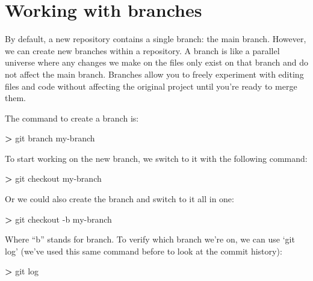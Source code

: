 \documentclass[
]{book}
\newenvironment{Shaded}{\begin{snugshade}}{\end{snugshade}}
\newcommand{\AttributeTok}[1]{\textcolor[rgb]{0.13,0.29,0.53}{#1}}
\newcommand{\ExtensionTok}[1]{#1}
\newcommand{\NormalTok}[1]{#1}
\newcommand{\OperatorTok}[1]{\textcolor[rgb]{0.81,0.36,0.00}{\textbf{#1}}}
\begin{document}
\hypertarget{working-with-branches}{%
\section{Working with branches}\label{working-with-branches}}

By default, a new repository contains a single branch: the main branch. However, we can create new branches within a repository. A branch is like a parallel universe where any changes we make on the files only exist on that branch and do not affect the main branch. Branches allow you to freely experiment with editing files and code without affecting the original project until you're ready to merge them.

The command to create a branch is:

\begin{Shaded}
\begin{Highlighting}[]
\OperatorTok{\textgreater{}}\NormalTok{ git }\ExtensionTok{branch}\NormalTok{ my{-}branch}
\end{Highlighting}
\end{Shaded}

To start working on the new branch, we switch to it with the following command:

\begin{Shaded}
\begin{Highlighting}[]
\OperatorTok{\textgreater{}}\NormalTok{ git }\ExtensionTok{checkout}\NormalTok{ my{-}branch}
\end{Highlighting}
\end{Shaded}

Or we could also create the branch and switch to it all in one:

\begin{Shaded}
\begin{Highlighting}[]
\OperatorTok{\textgreater{}}\NormalTok{ git }\ExtensionTok{checkout} \AttributeTok{{-}b}\NormalTok{ my{-}branch}
\end{Highlighting}
\end{Shaded}

Where ``b'' stands for branch. To verify which branch we're on, we can use `git log' (we've used this same command before to look at the commit history):

\begin{Shaded}
\begin{Highlighting}[]
\OperatorTok{\textgreater{}}\NormalTok{ git }\ExtensionTok{log} 
\end{Highlighting}
\end{Shaded}
\end{document}
